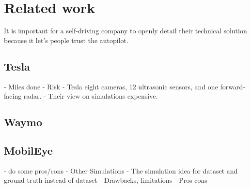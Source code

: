 \chapter{Related work}
\label{chap:relatedwork}


It is important for a self-driving company to openly detail their technical solution because it let's people trust the autopilot.

\section{Tesla}
- Miles done
- Risk
- Tesla  eight cameras, 12 ultrasonic sensors, and one forward-facing radar.
  - Their view on simulations
expensive.
\section{Waymo}
\section{MobilEye}

  -  do some pros/cons
- Other Simulations
- The simulation idea for dataset and ground truth instead of dataset
  - Drawbacks, limitations
  - Pros cons
